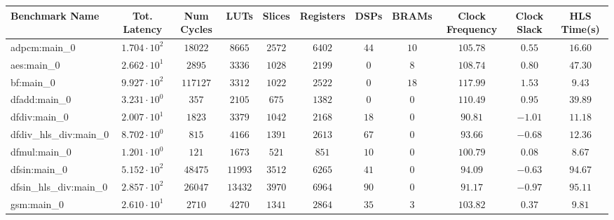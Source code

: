\begin{tabular}{|l|c|c|c|c|c|c|c|c|c|c|}
\hline
Benchmark Name          & Tot. Latency           & Num Cycles & LUTs      & Slices    & Registers & DSPs    & BRAMs   & Clock Frequency & Clock Slack & HLS Time(s) \\
\hline
adpcm:main\_0           & $ 1.704 \cdot 10^{2} $ & $ 18022  $ & $ 8665  $ & $ 2572  $ & $ 6402  $ & $ 44  $ & $ 10  $ & $ 105.78      $ & $ 0.55    $ & $ 16.60   $ \\
aes:main\_0             & $ 2.662 \cdot 10^{1} $ & $ 2895   $ & $ 3336  $ & $ 1028  $ & $ 2199  $ & $ 0   $ & $ 8   $ & $ 108.74      $ & $ 0.80    $ & $ 47.30   $ \\
bf:main\_0              & $ 9.927 \cdot 10^{2} $ & $ 117127 $ & $ 3312  $ & $ 1022  $ & $ 2522  $ & $ 0   $ & $ 18  $ & $ 117.99      $ & $ 1.53    $ & $ 9.43    $ \\
dfadd:main\_0           & $ 3.231 \cdot 10^{0} $ & $ 357    $ & $ 2105  $ & $ 675   $ & $ 1382  $ & $ 0   $ & $ 0   $ & $ 110.49      $ & $ 0.95    $ & $ 39.89   $ \\
dfdiv:main\_0           & $ 2.007 \cdot 10^{1} $ & $ 1823   $ & $ 3379  $ & $ 1042  $ & $ 2168  $ & $ 18  $ & $ 0   $ & $ 90.81       $ & $ -1.01   $ & $ 11.18   $ \\
dfdiv\_hls\_div:main\_0 & $ 8.702 \cdot 10^{0} $ & $ 815    $ & $ 4166  $ & $ 1391  $ & $ 2613  $ & $ 67  $ & $ 0   $ & $ 93.66       $ & $ -0.68   $ & $ 12.36   $ \\
dfmul:main\_0           & $ 1.201 \cdot 10^{0} $ & $ 121    $ & $ 1673  $ & $ 521   $ & $ 851   $ & $ 10  $ & $ 0   $ & $ 100.79      $ & $ 0.08    $ & $ 8.67    $ \\
dfsin:main\_0           & $ 5.152 \cdot 10^{2} $ & $ 48475  $ & $ 11993 $ & $ 3512  $ & $ 6265  $ & $ 41  $ & $ 0   $ & $ 94.09       $ & $ -0.63   $ & $ 94.67   $ \\
dfsin\_hls\_div:main\_0 & $ 2.857 \cdot 10^{2} $ & $ 26047  $ & $ 13432 $ & $ 3970  $ & $ 6964  $ & $ 90  $ & $ 0   $ & $ 91.17       $ & $ -0.97   $ & $ 95.11   $ \\
gsm:main\_0             & $ 2.610 \cdot 10^{1} $ & $ 2710   $ & $ 4270  $ & $ 1341  $ & $ 2864  $ & $ 35  $ & $ 3   $ & $ 103.82      $ & $ 0.37    $ & $ 9.81    $ \\

\end{tabular}
